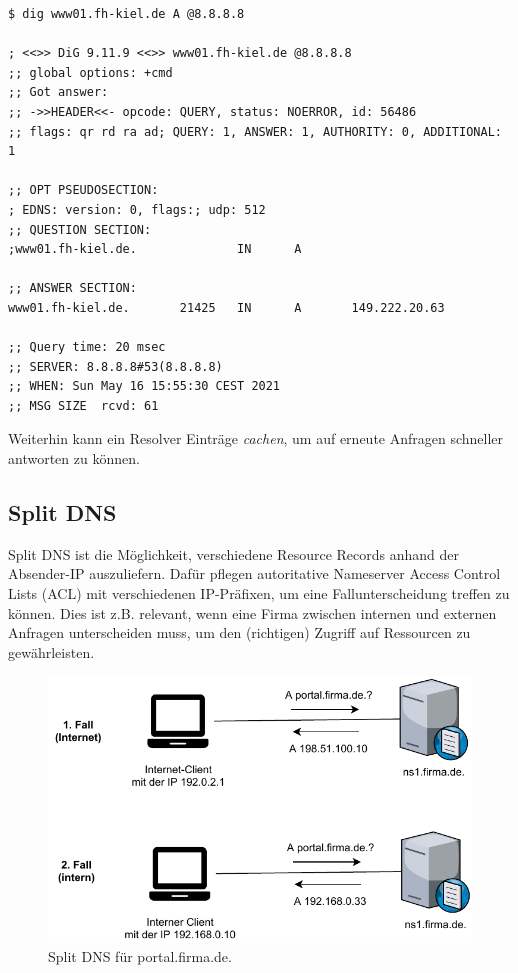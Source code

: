 \begin{lstlisting}[label=dig-example-fh-kiel,caption=Eine DNS-Auflösung für einen A-Record (www01.fh-kiel.de) gegen den Resolver von Google (8.8.8.8)]
$ dig www01.fh-kiel.de A @8.8.8.8

; <<>> DiG 9.11.9 <<>> www01.fh-kiel.de @8.8.8.8
;; global options: +cmd
;; Got answer:
;; ->>HEADER<<- opcode: QUERY, status: NOERROR, id: 56486
;; flags: qr rd ra ad; QUERY: 1, ANSWER: 1, AUTHORITY: 0, ADDITIONAL: 1

;; OPT PSEUDOSECTION:
; EDNS: version: 0, flags:; udp: 512
;; QUESTION SECTION:
;www01.fh-kiel.de.              IN      A

;; ANSWER SECTION:
www01.fh-kiel.de.       21425   IN      A       149.222.20.63

;; Query time: 20 msec
;; SERVER: 8.8.8.8#53(8.8.8.8)
;; WHEN: Sun May 16 15:55:30 CEST 2021
;; MSG SIZE  rcvd: 61
\end{lstlisting}



Weiterhin kann ein Resolver Einträge \textit{cachen}, um auf erneute Anfragen schneller antworten zu können.%

\subsection{Split DNS}
Split DNS ist die Möglichkeit, verschiedene Resource Records anhand der Absender-IP auszuliefern. Dafür pflegen autoritative Nameserver Access Control Lists (ACL) mit verschiedenen IP-Präfixen, um eine Fallunterscheidung treffen zu können. Dies ist z.B. relevant, wenn eine Firma zwischen internen und externen Anfragen unterscheiden muss, um den (richtigen) Zugriff auf Ressourcen zu gewährleisten.

\begin{figure}[h]
  \centering
  \includegraphics{Figures/dns_split_view.pdf}
  \caption{Split DNS für portal.firma.de.}
  \label{grafik: split-dns}
\end{figure}\FloatBarrier

